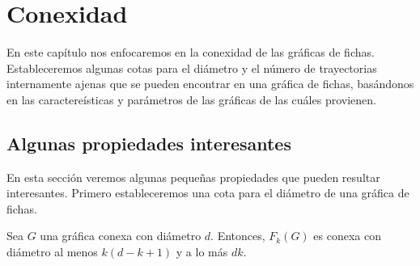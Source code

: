 \chapter{Conexidad}%
\label{cap:conexidad}

En este cap\'itulo nos enfocaremos en la conexidad de las gr\'aficas de fichas.
Estableceremos algunas cotas para el di\'ametro y el n\'umero de trayectorias
internamente ajenas que se pueden encontrar en una gr\'afica de fichas,
bas\'andonos en las caractere\'isticas y par\'ametros de las gr\'aficas de las
cu\'ales provienen.

\section{Algunas propiedades interesantes}%
\label{sec:etiquetas}

En esta secci\'on veremos algunas peque\~{n}as propiedades que pueden
resultar interesantes. Primero estableceremos una cota para el di\'ametro de una
gr\'afica de fichas.

\begin{teorema}%
\label{teo:diamFG}
Sea $G$ una gr\'afica conexa con di\'ametro $d$. Entonces, $F_{k}(G)$ es 
conexa con di\'ametro al menos $k(d -k+1)$ y a lo m\'as $d k$.
\end{teorema}

